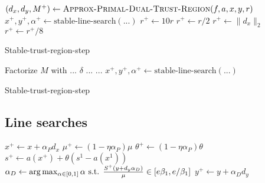 \documentclass{article}
\begin{document}
\begin{algorithm}[H]
\begin{algorithmic}
\State $(d_{x}, d_{y}, M^{+}) \gets  \Call{Approx-Primal-Dual-Trust-Region}{\obj, \cons, x, y, r}$
\State $x^{+}, y^{+}, \alpha^{+} \gets \text{stable-line-search}(...)$
\If{$\alpha^{+} > \alpha_{\min}$}
\State $r^{+} \gets 10 r$
\State $r^{+} \gets r / 2$
\Else
\State $r^{+} \gets \| d_{x} \|_{2}$
\EndIf
\State \algorithmicbreak
\EndIf
\State $r^{+} \gets r^{+} / 8$
\EndFor
\State {}
\EndFunction
\end{algorithmic}
\caption{Stable-trust-region-step}
\end{algorithm}

\begin{algorithm}[H]
\begin{algorithmic}
\State Factorize $M$ with ... $\delta$ ...
\State ...
\EndIf
\State $x^{+}, y^{+}, \alpha^{+} \gets \text{stable-line-search}(...)$
\EndFor
\State {}
\EndFunction
\end{algorithmic}
\caption{Stable-trust-region-step}
\end{algorithm}

\subsection{Line searches}

\begin{algorithm}[H]
\begin{algorithmic}
\State $x^{+} \gets x + \alpha_{P} d_{x}$
\State $\mu^{+} \gets (1 - \eta \alpha_{P}) \mu$
\State $\theta^{+} \gets (1 - \eta \alpha_{P}) \theta$
\State $s^{+} \gets a(x^{+}) + \theta (  s^{1} - a(x^{1}) )$
\State $\alpha_{D} \gets \arg \max_{\alpha \in [0,1]} {\alpha} \text{ s.t. } \frac{S^{+} (y + d_{y} \alpha_{D})}{\mu} \in [ e \beta_{1}, e / \beta_{1} ] $
\State $y^{+} \gets y + \alpha_{D} d_{y}$
\EndFunction
\end{algorithmic}
\end{algorithm}
\end{document}
